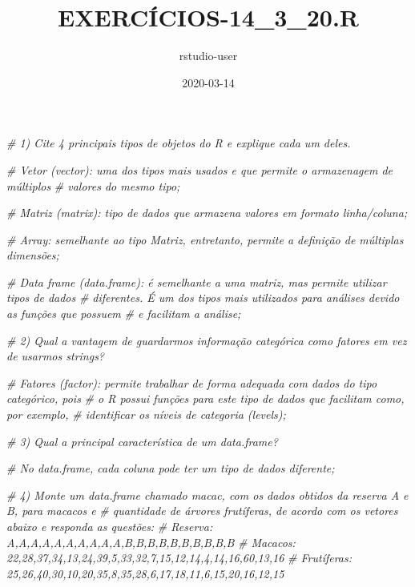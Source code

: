 \documentclass[]{article}
\title{EXERCÍCIOS-14\_3\_20.R}
\author{rstudio-user}
\date{2020-03-14}
\newenvironment{Shaded}{\begin{snugshade}}{\end{snugshade}}
\newcommand{\CommentTok}[1]{\textcolor[rgb]{0.56,0.35,0.01}{\textit{#1}}}
\begin{document}
\maketitle

\begin{Shaded}
\begin{Highlighting}[]
\CommentTok{# 1) Cite 4 principais tipos de objetos do R e explique cada um deles.}

  \CommentTok{# Vetor (vector): uma dos tipos mais usados e que permite o armazenagem de múltiplos}
  \CommentTok{# valores do mesmo tipo;}

  \CommentTok{# Matriz (matrix): tipo de dados que armazena valores em formato linha/coluna;}

  \CommentTok{# Array: semelhante ao tipo Matriz, entretanto, permite a definição de múltiplas dimensões;}

  \CommentTok{# Data frame (data.frame): é semelhante a uma matriz, mas permite utilizar tipos de dados}
  \CommentTok{# diferentes. É um dos tipos mais utilizados para análises devido as funções que possuem}
  \CommentTok{# e facilitam a análise;}

\CommentTok{# 2) Qual a vantagem de guardarmos informação categórica como fatores em vez de usarmos strings?}

  \CommentTok{# Fatores (factor): permite trabalhar de forma adequada com dados do tipo categórico, pois}
  \CommentTok{# o R possui funções para este tipo de dados que facilitam como, por exemplo,}
  \CommentTok{# identificar os níveis de categoria (levels);}

\CommentTok{# 3) Qual a principal característica de um data.frame?}

  \CommentTok{# No data.frame, cada coluna pode ter um tipo de dados diferente;}

\CommentTok{# 4) Monte um data.frame chamado macac, com os dados obtidos da reserva A e B, para macacos e}
\CommentTok{# quantidade de árvores frutíferas, de acordo com os vetores abaixo e responda as questões:}
\CommentTok{# Reserva: A,A,A,A,A,A,A,A,A,A,B,B,B,B,B,B,B,B,B,B}
\CommentTok{# Macacos: 22,28,37,34,13,24,39,5,33,32,7,15,12,14,4,14,16,60,13,16}
\CommentTok{# Frutíferas: 25,26,40,30,10,20,35,8,35,28,6,17,18,11,6,15,20,16,12,15}


\end{Highlighting}
\end{Shaded}
\end{document}
